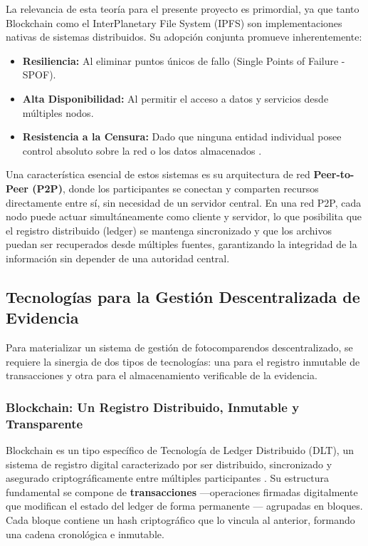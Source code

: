 La relevancia de esta teoría para el presente proyecto es primordial, ya que tanto Blockchain como el InterPlanetary File System (IPFS) son implementaciones nativas de sistemas distribuidos. Su adopción conjunta promueve inherentemente:
\begin{itemize}
    \item \textbf{Resiliencia:} Al eliminar puntos únicos de fallo (Single Points of Failure - SPOF).
    \item \textbf{Alta Disponibilidad:} Al permitir el acceso a datos y servicios desde múltiples nodos.
    \item \textbf{Resistencia a la Censura:} Dado que ninguna entidad individual posee control absoluto sobre la red o los datos almacenados \parencite{antonopoulos2023mastering}.
\end{itemize}

Una característica esencial de estos sistemas es su arquitectura de red \textbf{Peer-to-Peer (P2P)}, donde los participantes se conectan y comparten recursos directamente entre sí, sin necesidad de un servidor central. En una red P2P, cada nodo puede actuar simultáneamente como cliente y servidor, lo que posibilita que el registro distribuido (ledger) se mantenga sincronizado y que los archivos puedan ser recuperados desde múltiples fuentes, garantizando la integridad de la información sin depender de una autoridad central.

\subsection{Tecnologías para la Gestión Descentralizada de Evidencia}
Para materializar un sistema de gestión de fotocomparendos descentralizado, se requiere la sinergia de dos tipos de tecnologías: una para el registro inmutable de transacciones y otra para el almacenamiento verificable de la evidencia.

\subsubsection{Blockchain: Un Registro Distribuido, Inmutable y Transparente}
Blockchain es un tipo específico de Tecnología de Ledger Distribuido (DLT), un sistema de registro digital caracterizado por ser distribuido, sincronizado y asegurado criptográficamente entre múltiples participantes \parencite{narayanan2016bitcoin}. Su estructura fundamental se compone de \textbf{transacciones} —operaciones firmadas digitalmente que modifican el estado del ledger de forma permanente \parencite{antonopoulos2023mastering}— agrupadas en bloques. Cada bloque contiene un hash criptográfico que lo vincula al anterior, formando una cadena cronológica e inmutable.

